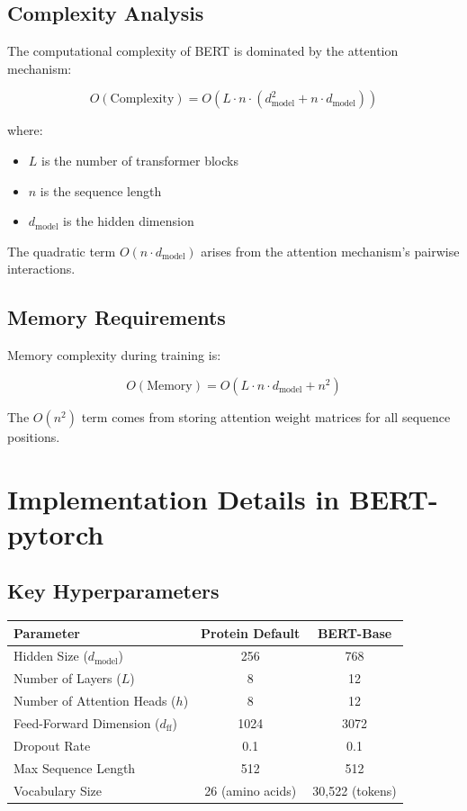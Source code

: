 \documentclass[11pt,a4paper]{article}
\begin{document}
\subsection{Complexity Analysis}

The computational complexity of BERT is dominated by the attention mechanism:

\begin{equation}
O(\text{Complexity}) = O(L \cdot n \cdot (d_{\text{model}}^2 + n \cdot d_{\text{model}}))
\end{equation}

where:
\begin{itemize}
    \item $L$ is the number of transformer blocks
    \item $n$ is the sequence length
    \item $d_{\text{model}}$ is the hidden dimension
\end{itemize}

The quadratic term $O(n \cdot d_{\text{model}})$ arises from the attention mechanism's pairwise interactions.

\subsection{Memory Requirements}

Memory complexity during training is:

\begin{equation}
O(\text{Memory}) = O(L \cdot n \cdot d_{\text{model}} + n^2)
\end{equation}

The $O(n^2)$ term comes from storing attention weight matrices for all sequence positions.

\section{Implementation Details in BERT-pytorch}

\subsection{Key Hyperparameters}

\begin{table}[H]
\centering
\begin{tabular}{|l|c|c|}
\hline
\textbf{Parameter} & \textbf{Protein Default} & \textbf{BERT-Base} \\
\hline
Hidden Size ($d_{\text{model}}$) & 256 & 768 \\
Number of Layers ($L$) & 8 & 12 \\
Number of Attention Heads ($h$) & 8 & 12 \\
Feed-Forward Dimension ($d_{\text{ff}}$) & 1024 & 3072 \\
Dropout Rate & 0.1 & 0.1 \\
Max Sequence Length & 512 & 512 \\
Vocabulary Size & 26 (amino acids) & 30,522 (tokens) \\
\hline
\end{tabular}
\end{table}
\end{document}
